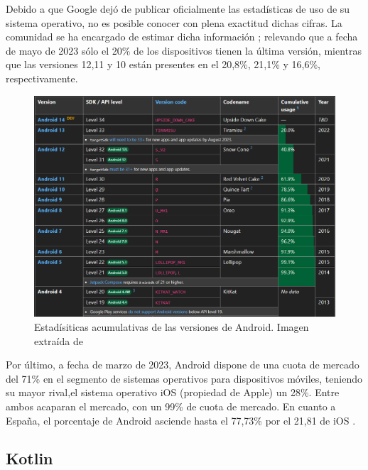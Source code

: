         Debido a que Google dejó de publicar oficialmente las estadísticas de uso de su sistema operativo, no es
        posible conocer con plena exactitud dichas cifras. La comunidad se ha encargado de estimar dicha 
        información \cite{belinski_android_nodate}; relevando que a fecha de mayo de 2023 sólo el 20\% de los 
        dispositivos tienen la última versión, mientras que las versiones 12,11 y 10 están presentes en el 
        20,8\%, 21,1\% y 16,6\%, respectivamente. 

        \begin{figure}[H]
            \centering
            \includegraphics[width=1\textwidth]{figures/Android usage.PNG}
            \caption[Estadísiticas acumulativas de las versiones de Android]
            {Estadísiticas acumulativas de las versiones de Android. Imagen extraída de \cite{belinski_android_nodate}}
            \label{figure:android:usage}
        \end{figure}

        Por último, a fecha de marzo de 2023, Android dispone de una cuota de mercado del 71\% en el segmento de sistemas 
        operativos para dispositivos móviles, teniendo su mayor rival,el sistema operativo iOS (propiedad de Apple) 
        un 28\%. Entre ambos acaparan el mercado, con un 99\% de cuota de mercado. En cuanto a España, el 
        porcentaje de Android asciende hasta el 77,73\% por el 21,81 de iOS \cite{press_asi_2023}.

    \subsection{Kotlin}


